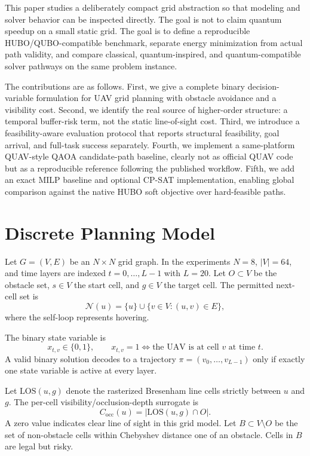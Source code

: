 \documentclass[10pt,conference]{IEEEtran}
\begin{document}
This paper studies a deliberately compact grid abstraction so that modeling and solver behavior can be inspected directly. The goal is not to claim quantum speedup on a small static grid. The goal is to define a reproducible HUBO/QUBO-compatible benchmark, separate energy minimization from actual path validity, and compare classical, quantum-inspired, and quantum-compatible solver pathways on the same problem instance.

The contributions are as follows. First, we give a complete binary decision-variable formulation for UAV grid planning with obstacle avoidance and a visibility cost. Second, we identify the real source of higher-order structure: a temporal buffer-risk term, not the static line-of-sight cost. Third, we introduce a feasibility-aware evaluation protocol that reports structural feasibility, goal arrival, and full-task success separately. Fourth, we implement a same-platform QUAV-style QAOA candidate-path baseline, clearly not as official QUAV code but as a reproducible reference following the published workflow. Fifth, we add an exact MILP baseline and optional CP-SAT implementation, enabling global comparison against the native HUBO soft objective over hard-feasible paths.

\section{Discrete Planning Model}
Let $G=(V,E)$ be an $N\times N$ grid graph. In the experiments $N=8$, $|V|=64$, and time layers are indexed $t=0,\ldots,L-1$ with $L=20$. Let $O\subset V$ be the obstacle set, $s\in V$ the start cell, and $g\in V$ the target cell. The permitted next-cell set is
\begin{equation}
\mathcal{N}(u)=\{u\}\cup\{v\in V:(u,v)\in E\},
\end{equation}
where the self-loop represents hovering.

The binary state variable is
\begin{equation}
 x_{t,v}\in\{0,1\},\qquad x_{t,v}=1 \Leftrightarrow \text{the UAV is at cell }v\text{ at time }t.
\end{equation}
A valid binary solution decodes to a trajectory $\pi=(v_0,\ldots,v_{L-1})$ only if exactly one state variable is active at every layer.

Let $\mathrm{LOS}(u,g)$ denote the rasterized Bresenham line cells strictly between $u$ and $g$. The per-cell visibility/occlusion-depth surrogate is
\begin{equation}
 C_{\mathrm{occ}}(u)=|\mathrm{LOS}(u,g)\cap O|.
\end{equation}
A zero value indicates clear line of sight in this grid model. Let $B\subset V\setminus O$ be the set of non-obstacle cells within Chebyshev distance one of an obstacle. Cells in $B$ are legal but risky.
\end{document}
